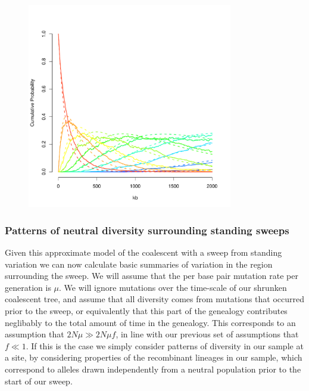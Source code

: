 \documentclass[a4paper,10pt]{article}
\begin{document}
\begin{figure}
	\includegraphics[width = 0.8\textwidth]{../Paper_Figures/Ewens_vs_Jeremy.pdf}
\end{figure}


\subsubsection{Patterns of neutral diversity surrounding standing sweeps}
Given this approximate model of the coalescent with a sweep from standing variation we can now calculate basic summaries of variation in the region surrounding the sweep. We will assume that the per base pair mutation rate per generation is $\mu$. We will ignore mutations over the time-scale of our shrunken coalescent tree, and assume that all diversity comes from mutations that occurred prior to the sweep, or equivalently that this part of the genealogy contributes neglibably to the total amount of time in the genealogy. This corresponds to an assumption that $2N\mu \gg 2N \mu f$, in line with our previous set of assumptions that $f \ll 1$. If this is the case we simply consider patterns of diversity in our sample at a site, by considering properties of the recombinant lineages in our sample, which correspond to alleles drawn independently from a neutral population prior to the start of our sweep.
\end{document}
